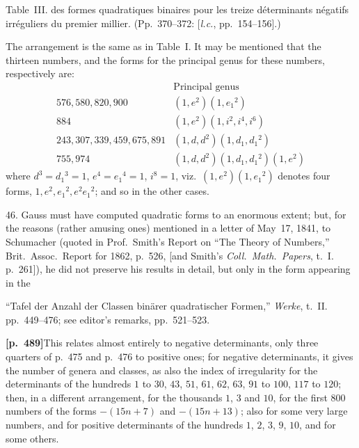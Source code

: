 \documentclass[11pt,a4paper]{article}
\begin{document}
Table~III. des formes quadratiques binaires pour les treize d\'eterminants n\'egatifs irr\'eguliers du premier millier. (Pp.~370--372: [\textit{l.c.}, pp.~154--156].)

The arrangement is the same as in Table~I. It may be mentioned that the thirteen numbers, and the forms for the principal genus for these numbers, respectively are:
\[
\begin{array}{l|l}
 & \text{Principal genus} \\
\hline
576, 580, 820, 900 & (1, e^{2})(1, e_{1}{}^{2}) \\
884 & (1, e^{2})(1, i^{2}, i^{4}, i^{6}) \\
243, 307, 339, 459, 675, 891 & (1, d, d^{2})(1, d_{1}, d_{1}{}^{2}) \\
755, 974 & (1, d, d^{2})(1, d_{1}, d_{1}{}^{2})(1, e^{2})
\end{array}
\]
where $d^{3} = d_{1}{}^{3} = 1$, $e^{4} = e_{1}{}^{4} = 1$, $i^{8} = 1$, viz.\ $(1, e^{2})(1, e_{1}{}^{2})$ denotes four forms, $1, e^{2}, e_{1}{}^{2}, e^{2}e_{1}{}^{2}$; and so in the other cases.

46. Gauss must have computed quadratic forms to an enormous extent; but, for the reasons (rather amusing ones) mentioned in a letter of May~17, 1841, to Schumacher (quoted in Prof.\ Smith's Report on ``The Theory of Numbers,'' Brit.\ Assoc.\ Report for 1862, p.~526, [and Smith's \textit{Coll.\ Math.\ Papers}, t.~I. p.~261]), he did not preserve his results in detail, but only in the form appearing in the

``Tafel der Anzahl der Classen bin\"arer quadratischer Formen,'' \textit{Werke}, t.~II. pp.~449--476; see editor's remarks, pp.~521--523.

\noindent\textbf{[p.~489]}\quad This relates almost entirely to negative determinants, only three quarters of p.~475 and p.~476 to positive ones; for negative determinants, it gives the number of genera and classes, as also the index of irregularity for the determinants of the hundreds $1$ to $30$, $43$, $51$, $61$, $62$, $63$, $91$ to $100$, $117$ to $120$; then, in a different arrangement, for the thousands $1$, $3$ and $10$, for the first $800$ numbers of the forms $-(15n + 7)$ and $-(15n + 13)$; also for some very large numbers, and for positive determinants of the hundreds $1$, $2$, $3$, $9$, $10$, and for some others.
\end{document}
